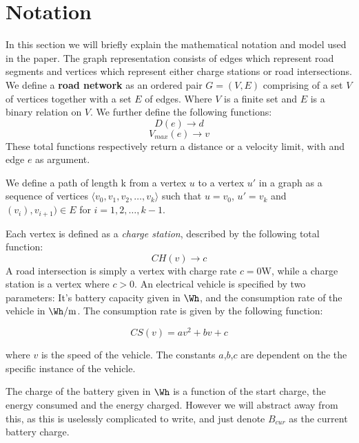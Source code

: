 \section{Notation}
In this section we will briefly explain the mathematical notation and model used in the paper. The graph representation consists of edges which represent road segments and vertices which represent either charge stations or road intersections. We define a \textbf{road network} as an ordered pair \(G=(V,E)\) comprising of a set $V$ of vertices together with a set $E$ of edges. Where $V$ is a finite set and $E$ is a binary relation on $V$. We further define the following functions:
\[ D(e)\rightarrow d \] 
\[ V_{max}(e)\rightarrow v \] 
These total functions respectively return a distance or a velocity limit, with and edge $e$ as argument.

We define a path of length k from a vertex $u$ to a vertex $u'$ in a graph as a sequence of vertices $\langle v_0,v_1,v_2,\dots,v_k \rangle$ such that $u=v_0$, $u'=v_k$ and $(v_{i}),v_{i+1})\in E$ for $i=1,2,\dots ,k-1$.

Each vertex is defined as a \textit{charge station}, described by the following total function:
\[CH(v)\rightarrow c\]
A road intersection is simply a vertex with charge rate $c = 0\si{\W}$, while a charge station is a vertex where $c > 0$. An electrical vehicle is specified by two parameters: It's battery capacity given in $\si{\Wh}$, and the consumption rate of the vehicle in $\si{\Wh\per\metre}$. The consumption rate is given by the following function:

\[CS(v)=av^2+bv+c\]

where $v$ is the speed of the vehicle. The constants $a$,$b$,$c$ are dependent on the the specific instance of the vehicle.

The charge of the battery given in $\si{\Wh}$ is a function of the start charge, the energy consumed and the energy charged. However we will abstract away from this, as this is uselessly complicated to write, and just denote $B_{cur}$ as the current battery charge.


